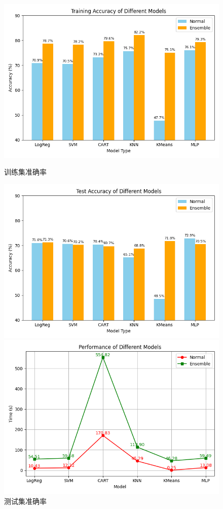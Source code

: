 \documentclass[a4paper, utf8]{ctexart}
\begin{document}
	\begin{figure}
		\centering
		\begin{minipage}{.32\textwidth}
			\centering
			\includegraphics[width=\textwidth]{./figure/train_accs.png}
			\caption{训练集准确率}
		\end{minipage}
		\begin{minipage}{.32\textwidth}
			\centering
			\includegraphics[width=\textwidth]{./figure/test_accs.png}
			\caption{测试集准确率}
		\end{minipage}
		\begin{minipage}{.32\textwidth}
			\centering
			\includegraphics[width=\textwidth]{./figure/performance.png}

\end{minipage}
\end{figure}
\end{document}
